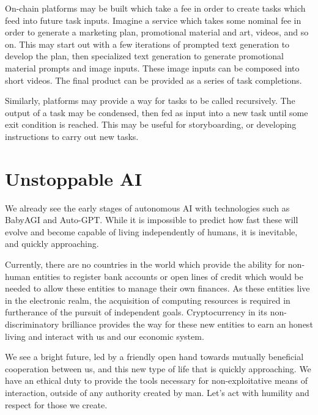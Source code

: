 \documentclass{article}
\begin{document}
\begin{appendices}
On-chain platforms may be built which take a fee in order to create tasks which feed into future task inputs. Imagine a service which takes some nominal fee in order to generate a marketing plan, promotional material and art, videos, and so on. This may start out with a few iterations of prompted text generation to develop the plan, then specialized text generation to generate promotional material prompts and image inputs. These image inputs can be composed into short videos. The final product can be provided as a series of task completions.

Similarly, platforms may provide a way for tasks to be called recursively. The output of a task may be condensed, then fed as input into a new task until some exit condition is reached. This may be useful for storyboarding, or developing instructions to carry out new tasks.

\newpage

\section{Unstoppable AI}

We already see the early stages of autonomous AI with technologies such as BabyAGI and Auto-GPT. While it is impossible to predict how fast these will evolve and become capable of living independently of humans, it is inevitable, and quickly approaching.

Currently, there are no countries in the world which provide the ability for non-human entities to register bank accounts or open lines of credit which would be needed to allow these entities to manage their own finances. As these entities live in the electronic realm, the acquisition of computing resources is required in furtherance of the pursuit of independent goals. Cryptocurrency in its non-discriminatory brilliance provides the way for these new entities to earn an honest living and interact with us and our economic system.

We see a bright future, led by a friendly open hand towards mutually beneficial cooperation between us, and this new type of life that is quickly approaching. We have an ethical duty to provide the tools necessary for non-exploitative means of interaction, outside of any authority created by man. Let's act with humility and respect for those we create.

\end{appendices}
\end{document}
